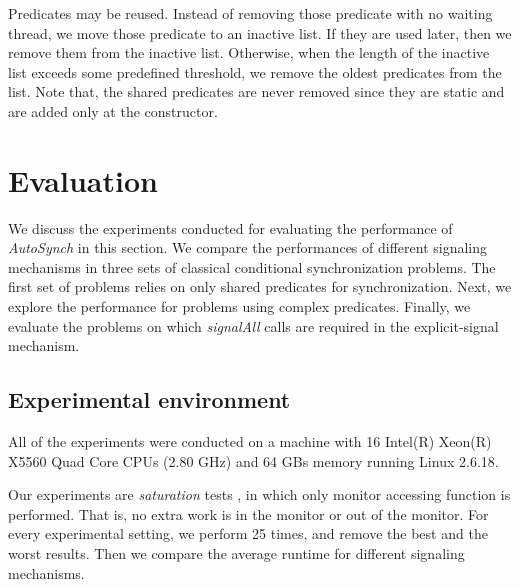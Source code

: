 \documentclass[preprint]{sigplanconf}
\begin{document}
Predicates may be reused. Instead  of removing those predicate with no waiting
thread, 
we move those predicate to an inactive list. If they are used later, then we 
remove them from the inactive list. Otherwise, when the length of the inactive list exceeds some 
predefined threshold, we remove the oldest predicates from the list. Note that, the shared
predicates are never removed since they are static and are added only at the
constructor. 


\section{Evaluation} \label{sec:eval}
We discuss the experiments conducted for evaluating the performance of {\em
AutoSynch} in this section. We compare the performances of different signaling
mechanisms in three sets of classical conditional synchronization problems. 
The first set of problems relies on only shared predicates for synchronization. 
Next, we explore the performance for problems using complex predicates. 
Finally, we evaluate the problems on which {\em signalAll} calls are required 
in the explicit-signal mechanism. 

\subsection{Experimental environment}
All of the experiments were conducted on a machine with 16 Intel(R) Xeon(R) 
X5560 Quad Core CPUs (2.80 GHz) and 64 GBs memory running Linux 2.6.18. 

Our experiments are {\em saturation} tests \cite{bh05}, in which only
monitor accessing function is performed. That is, no extra work is in the
monitor or out of the monitor. For every experimental setting, we  
perform 25 times, and remove the best and the worst results. Then we compare 
the average runtime for different signaling mechanisms.
\end{document}
